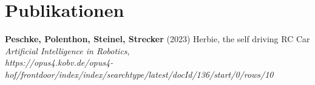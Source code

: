 \section{Publikationen}\label{sec: publikationen}
\textbf{Peschke, Polenthon, Steinel, Strecker}
(2023) Herbie, the self driving RC Car \textit{Artificial Intelligence in Robotics},\\
\textit{https://opus4.kobv.de/opus4-hof/frontdoor/index/index/\newline searchtype/latest/docId/136/start/0/rows/10}